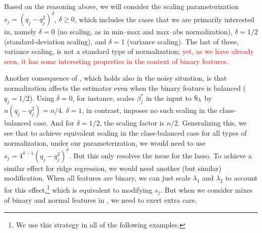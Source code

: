 Based on the reasoning above, we will consider the scaling parameterization \(s_j =
(q_j-q_j^2)^\delta\), \(\delta \geq 0\), which includes the cases that we are primarily
interested in, namely \(\delta = 0\) (no scaling, as in min--max and max--abs
normalization), \(\delta = 1/2\) (standard-deviation scaling), and \(\delta = 1\) (variance
scaling). The last of these, variance scaling, is not a standard type of normalization;
\textcolor{red}{yet, as we have already seen, it has some interesting properties in the context of binary
features. }

Another consequence of , which holds also in the noisy
situation, is that normalization affects the estimator even when the binary feature is
balanced (\(q_j = 1/2\)). Using \(\delta = 0\), for instance, scales \(\beta_j^*\) in the
input to \(\operatorname{S}_\lambda\) by \(n (q_j - q_j^2) = n/4\). \(\delta = 1\), in contrast, imposes
no such scaling in the class-balanced case. And for \(\delta = 1/2\), the scaling factor is
\(n/2\). Generalizing this, we see that to achieve equivalent scaling in the class-balanced
case for all types of normalization, under our parameterization, we would need to use \(s_j
= 4^{\delta - 1} (q_j - q_j^2)^\delta\). But this only resolves the issue for the lasso. To
achieve a similar effect for ridge regression, we would need another (but similar)
modification. When all features are binary, we can just scale \(\lambda_1\) and
\(\lambda_2\) to account for this effect,\footnote{We use this strategy in all of the
  following examples.} which is equivalent to modifying \(s_j\). But when we consider mixes
of binary and normal features in , we need to exert extra care.

